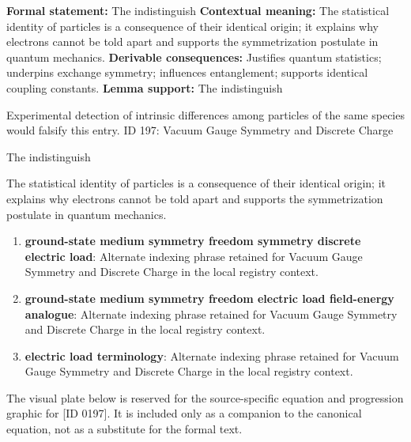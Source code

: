 \begingroup\footnotesize\setlength{\emergencystretch}{3em}\sloppy
\textbf{Formal statement:} The indistinguish
\textbf{Contextual meaning:} The statistical identity of particles is a consequence of their identical origin; it explains why electrons cannot be told apart and supports the symmetrization postulate in quantum mechanics.  
\textbf{Derivable consequences:} Justifies quantum statistics; underpins exchange symmetry; influences entanglement; supports identical coupling constants.  
\textbf{Lemma support:} The indistinguish\par
\endgroup

Experimental detection of intrinsic differences among particles of the same species would falsify this entry. ID 197: Vacuum Gauge Symmetry and Discrete Charge  

The indistinguish

The statistical identity of particles is a consequence of their identical origin; it explains why electrons cannot be told apart and supports the symmetrization postulate in quantum mechanics.  
\endgroup

\begin{enumerate}[leftmargin=1.6em,itemsep=6pt,topsep=4pt]
\item \textbf{ground-state medium symmetry freedom symmetry discrete electric load}: Alternate indexing phrase retained for Vacuum Gauge Symmetry and Discrete Charge in the local registry context.
\item \textbf{ground-state medium symmetry freedom electric load field-energy analogue}: Alternate indexing phrase retained for Vacuum Gauge Symmetry and Discrete Charge in the local registry context.
\item \textbf{electric load terminology}: Alternate indexing phrase retained for Vacuum Gauge Symmetry and Discrete Charge in the local registry context.
\end{enumerate}

\begingroup\footnotesize\sloppy
The visual plate below is reserved for the source-specific equation and progression graphic for [ID 0197]. It is included only as a companion to the canonical equation, not as a substitute for the formal text.
\par\endgroup
\ifTZPDarkEdition
{}
\fi

